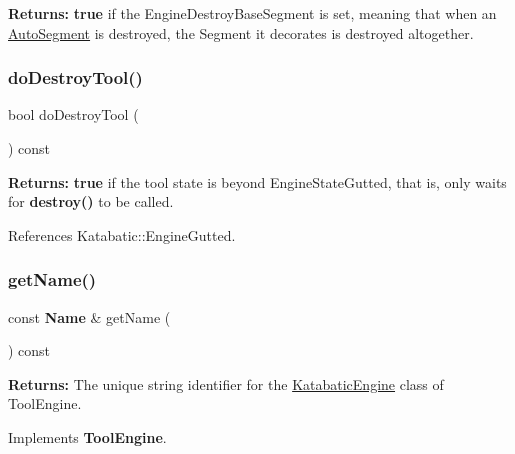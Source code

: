 {\bfseries Returns\+:} {\bfseries true} if the Engine\+Destroy\+Base\+Segment is set, meaning that when an \hyperlink{classKatabatic_1_1AutoSegment}{Auto\+Segment} is destroyed, the Segment it decorates is destroyed altogether. \mbox{\label{classKatabatic_1_1KatabaticEngine_a867e6dbfea5e5895a01ef71c66398b26}} 
\subsubsection{\texorpdfstring{do\+Destroy\+Tool()}{doDestroyTool()}}
{\footnotesize\ttfamily bool do\+Destroy\+Tool (\begin{DoxyParamCaption}{ }\end{DoxyParamCaption}) const\hspace{0.3cm}{\ttfamily [inline]}}

{\bfseries Returns\+:} {\bfseries true} if the tool state is beyond Engine\+State\+Gutted, that is, only waits for {\ttfamily \textbf{ destroy()}} to be called. 

References Katabatic\+::\+Engine\+Gutted.

\mbox{\label{classKatabatic_1_1KatabaticEngine_a9e76ae5cee9320b65251387419c9432b}} 
\subsubsection{\texorpdfstring{get\+Name()}{getName()}}
{\footnotesize\ttfamily const \textbf{ Name} \& get\+Name (\begin{DoxyParamCaption}{ }\end{DoxyParamCaption}) const\hspace{0.3cm}{\ttfamily [virtual]}}

{\bfseries Returns\+:} The unique string identifier for the \hyperlink{classKatabatic_1_1KatabaticEngine}{Katabatic\+Engine} class of Tool\+Engine. 

Implements \textbf{ Tool\+Engine}.



